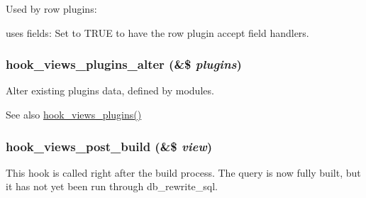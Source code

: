 \begin{DoxyItemize}
\item Used by row plugins:
\begin{DoxyItemize}
\item uses fields: Set to TRUE to have the row plugin accept field handlers. 
\end{DoxyItemize}
\end{DoxyItemize}\hypertarget{group__views__hooks_ga6c4e4c2a769b0017bf0edcd0adae57e9}{
\subsubsection[{hook\_\-views\_\-plugins\_\-alter}]{\setlength{\rightskip}{0pt plus 5cm}hook\_\-views\_\-plugins\_\-alter (\&\$ {\em plugins})}}
\label{group__views__hooks_ga6c4e4c2a769b0017bf0edcd0adae57e9}
Alter existing plugins data, defined by modules.

\begin{DoxySeeAlso}{See also}
\hyperlink{group__views__hooks_ga23f6e9972b2ed84fc54b7ff63f44477d}{hook\_\-views\_\-plugins()} 
\end{DoxySeeAlso}
\hypertarget{group__views__hooks_ga1c869865c1fafafcfb8a31a1fbc5c135}{
\subsubsection[{hook\_\-views\_\-post\_\-build}]{\setlength{\rightskip}{0pt plus 5cm}hook\_\-views\_\-post\_\-build (\&\$ {\em view})}}
\label{group__views__hooks_ga1c869865c1fafafcfb8a31a1fbc5c135}
This hook is called right after the build process. The query is now fully built, but it has not yet been run through db\_\-rewrite\_\-sql.

